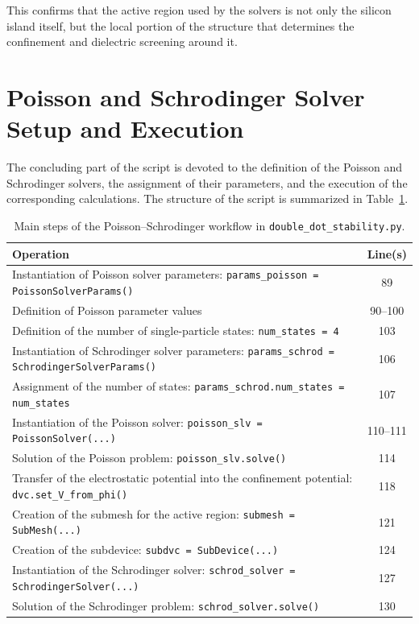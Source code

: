 This confirms that the active region used by the solvers is not only the silicon island itself, but the local portion of the structure that determines the confinement and dielectric screening around it.

\newpage
\section{Poisson and Schrodinger Solver Setup and Execution}
The concluding part of the script is devoted to the definition of the Poisson and Schrodinger solvers, the assignment of their parameters, and the execution of the corresponding calculations. The structure of the script is summarized in Table~\ref{tab:solver-lines}.

\begin{table}[H]
\centering
\begin{tabular}{|p{8.3cm}|c|}
\hline
\textbf{Operation} & \textbf{Line(s)} \\
\hline
Instantiation of Poisson solver parameters: \texttt{params\_poisson = PoissonSolverParams()} & 89 \\
\hline
Definition of Poisson parameter values & 90--100 \\
\hline
Definition of the number of single-particle states: \texttt{num\_states = 4} & 103 \\
\hline
Instantiation of Schrodinger solver parameters: \texttt{params\_schrod = SchrodingerSolverParams()} & 106 \\
\hline
Assignment of the number of states: \texttt{params\_schrod.num\_states = num\_states} & 107 \\
\hline
Instantiation of the Poisson solver: \texttt{poisson\_slv = PoissonSolver(...)} & 110--111 \\
\hline
Solution of the Poisson problem: \texttt{poisson\_slv.solve()} & 114 \\
\hline
Transfer of the electrostatic potential into the confinement potential: \texttt{dvc.set\_V\_from\_phi()} & 118 \\
\hline
Creation of the submesh for the active region: \texttt{submesh = SubMesh(...)} & 121 \\
\hline
Creation of the subdevice: \texttt{subdvc = SubDevice(...)} & 124 \\
\hline
Instantiation of the Schrodinger solver: \texttt{schrod\_solver = SchrodingerSolver(...)} & 127 \\
\hline
Solution of the Schrodinger problem: \texttt{schrod\_solver.solve()} & 130 \\
\hline
\end{tabular}
\caption{Main steps of the Poisson--Schrodinger workflow in \texttt{double\_dot\_stability.py}.}
\label{tab:solver-lines}
\end{table}

